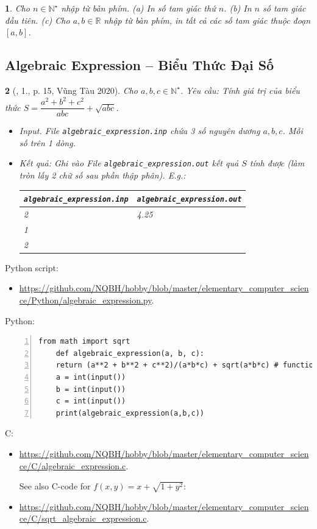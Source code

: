 \documentclass{article}
\newtheorem{baitoan}{}
\begin{document}
\begin{baitoan}
	Cho $n\in\mathbb{N}^\star$ nhập từ bàn phím. (a) In số tam giác thứ $n$. (b) In $n$ số tam giác đầu tiên. (c) Cho $a,b\in\mathbb{R}$ nhập từ bàn phím, in tất cả các số tam giác thuộc đoạn $[a,b]$.
\end{baitoan}



\subsection{Algebraic Expression -- Biểu Thức Đại Số}

\begin{baitoan}[\cite{VietSTEM2021}, 1., p. 15, Vũng Tàu 2020]
	Cho $a,b,c\in\mathbb{N}^\star$. {\sf Yêu cầu:} Tính giá trị của biểu thức $S = \dfrac{a^2 + b^2 + c^2}{abc} + \sqrt{abc}$.
	\begin{itemize}
		\item {\sf Input.} File \verb|algebraic_expression.inp| chứa 3 số nguyên dương $a,b,c$. Mỗi số trên 1 dòng.
		\item {\sf Kết quả:} Ghi vào File \verb|algebraic_expression.out| kết quả $S$ tính được (làm tròn lấy 2 chữ số sau phần thập phân). E.g.:
		\begin{table}[H]
			\centering
			\begin{tabular}{|l|l|}
				\hline
				\verb|algebraic_expression.inp| & \verb|algebraic_expression.out| \\
				\hline
				2 & 4.25 \\
				1 &  \\
				2 &  \\
				\hline
			\end{tabular}
		\end{table}
	\end{itemize}
\end{baitoan}
Python script:
\begin{itemize}
	\item \url{https://github.com/NQBH/hobby/blob/master/elementary_computer_science/Python/algebraic_expression.py}.
\end{itemize}
Python:
\begin{Verbatim}[numbers=left,xleftmargin=5mm]
	from math import sqrt
	def algebraic_expression(a, b, c):
	return (a**2 + b**2 + c**2)/(a*b*c) + sqrt(a*b*c) # function f(a,b,c) can be modified
	a = int(input())
	b = int(input())
	c = int(input())
	print(algebraic_expression(a,b,c))
\end{Verbatim}
C:
\begin{itemize}
	\item \url{https://github.com/NQBH/hobby/blob/master/elementary_computer_science/C/algebraic_expression.c}.
	
	See also C-code for $f(x,y) = x + \sqrt{1 + y^2}$:
	\item \url{https://github.com/NQBH/hobby/blob/master/elementary_computer_science/C/sqrt_algebraic_expression.c}.
\end{itemize}
\end{document}
